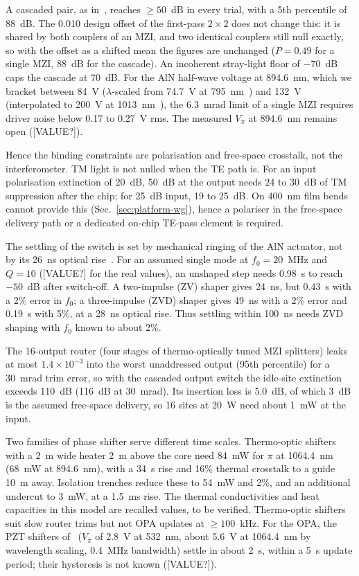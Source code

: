A cascaded pair, as in~\cite{ZHAO}, reaches $\ge 50$~dB in every trial, with a 5th percentile of 88~dB. The 0.010 design offset of the first-pass $2\times2$ does not change this: it is shared by both couplers of an MZI, and two identical couplers still null exactly, so with the offset as a shifted mean the figures are unchanged ($P = 0.49$ for a single MZI, 88~dB for the cascade). An incoherent stray-light floor of $-70$~dB caps the cascade at 70~dB. For the AlN half-wave voltage at 894.6~nm, which we bracket between 84~V ($\lambda$-scaled from 74.7~V at 795~nm~\cite{ZHAO}) and 132~V (interpolated to 200~V at 1013~nm~\cite{ZHAO}), the 6.3~mrad limit of a single MZI requires driver noise below 0.17 to 0.27~V rms. The measured $V_\pi$ at 894.6~nm remains open ([VALUE?]).

Hence the binding constraints are polarisation and free-space crosstalk, not the interferometer. TM light is not nulled when the TE path is. For an input polarisation extinction of 20~dB, 50~dB at the output needs 24 to 30~dB of TM suppression after the chip; for 25~dB input, 19 to 25~dB. On 400~nm film bends cannot provide this (Sec.~\ref{sec:platform-wg}), hence a polariser in the free-space delivery path or a dedicated on-chip TE-pass element is required.

The settling of the switch is set by mechanical ringing of the AlN actuator, not by its 26~ns optical rise~\cite{ZHAO}. For an assumed single mode at $f_0 = 20$~MHz and $Q = 10$ ([VALUE?] for the real values), an unshaped step needs 0.98~\textmu s to reach $-50$~dB after switch-off. A two-impulse (ZV) shaper gives 24~ns, but 0.43~\textmu s with a 2\% error in $f_0$; a three-impulse (ZVD) shaper gives 49~ns with a 2\% error and 0.19~\textmu s with 5\%, at a 28~ns optical rise. Thus settling within 100~ns needs ZVD shaping with $f_0$ known to about 2\%.

The 16-output router (four stages of thermo-optically tuned MZI splitters) leaks at most $1.4\times10^{-3}$ into the worst unaddressed output (95th percentile) for a 30~mrad trim error, so with the cascaded output switch the idle-site extinction exceeds 110~dB (116~dB at 30~mrad). Its insertion loss is 5.0~dB, of which 3~dB is the assumed free-space delivery, so 16 sites at 20~\textmu W need about 1~mW at the input.

Two families of phase shifter serve different time scales. Thermo-optic shifters with a 2~\textmu m wide heater 2~\textmu m above the core need 84~mW for $\pi$ at 1064.4~nm (68~mW at 894.6~nm), with a 34~\textmu s rise and 16\% thermal crosstalk to a guide 10~\textmu m away. Isolation trenches reduce these to 54~mW and 2\%, and an additional undercut to 3~mW, at a 1.5~ms rise. The thermal conductivities and heat capacities in this model are recalled values, to be verified. Thermo-optic shifters suit slow router trims but not OPA updates at $\ge 100$~kHz. For the OPA, the PZT shifters of~\cite{MONT} ($V_\pi$ of 2.8~V at 532~nm, about 5.6~V at 1064.4~nm by wavelength scaling, 0.4~MHz bandwidth) settle in about 2~\textmu s, within a 5~\textmu s update period; their hysteresis is not known ([VALUE?]).

